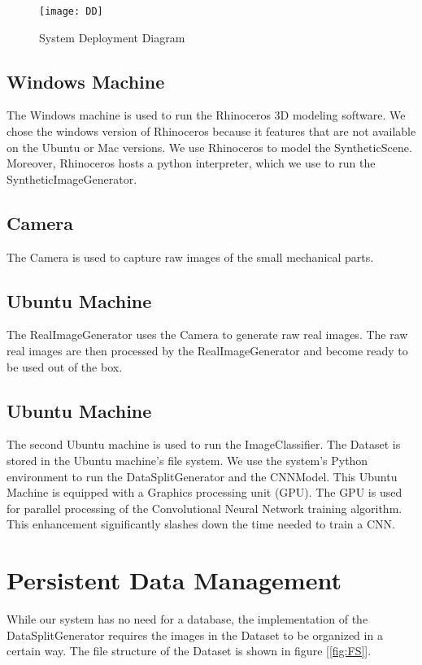 \begin{figure}[h]
\centering
  \texttt{[image: DD]}
\caption{System Deployment Diagram}
\label{fig:DD}
\end{figure}

\subsection{Windows Machine}
The Windows machine is used to run the Rhinoceros 3D modeling software. We chose the windows version of Rhinoceros because it features that are not available on the Ubuntu or Mac versions. We use Rhinoceros to model the SyntheticScene. Moreover, Rhinoceros hosts a python interpreter, which we use to run the SyntheticImageGenerator.

\subsection{Camera}
The Camera is used to capture raw images of the small mechanical parts.

\subsection{Ubuntu Machine}
The RealImageGenerator uses the Camera to generate raw real images. The raw real images are then processed by the RealImageGenerator and become ready to be used out of the box.

\subsection{Ubuntu Machine}
The second Ubuntu machine is used to run the ImageClassifier. The Dataset is stored in the Ubuntu machine's file system. We use the system's Python environment to run the DataSplitGenerator and the CNNModel. This Ubuntu Machine is equipped with a Graphics processing unit (GPU). The GPU is used for parallel processing of the Convolutional Neural Network training algorithm. This enhancement significantly slashes down the time needed to train a CNN.

\section{Persistent Data Management}

While our system has no need for a database, the implementation of the DataSplitGenerator requires the images in the Dataset to be organized in a certain way. The file structure of the Dataset is shown in figure [\ref{fig:FS}].

